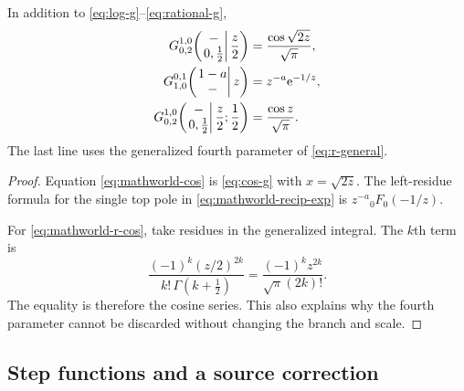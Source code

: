 \begin{theorem}\label{thm:mathworld-specials}
In addition to \eqref{eq:log-g}--\eqref{eq:rational-g},
\begin{align}
G_{0,2}^{1,0}\!\left(
 \left.\begin{matrix}-\\0,\frac12\end{matrix}\right|\frac z2\right)
 &=\frac{\cos\sqrt{2z}}{\sqrt\pi},
 \label{eq:mathworld-cos}\\
G_{1,0}^{0,1}\!\left(
 \left.\begin{matrix}1-a\\-\end{matrix}\right|z\right)
 &=z^{-a}\mathrm e^{-1/z},
 \label{eq:mathworld-recip-exp}\\
G_{0,2}^{1,0}\!\left(
 \left.\begin{matrix}-\\0,\frac12\end{matrix}\right|\frac z2;\frac12\right)
 &=\frac{\cos z}{\sqrt\pi}.
 \label{eq:mathworld-r-cos}
\end{align}
The last line uses the generalized fourth parameter of
\eqref{eq:r-general}.
\end{theorem}
\begin{proof}
Equation \eqref{eq:mathworld-cos} is \eqref{eq:cos-g} with
$x=\sqrt{2z}$.  The left-residue formula for the single top pole in
\eqref{eq:mathworld-recip-exp} is
$z^{-a}{}_0F_0(-1/z)$.

For \eqref{eq:mathworld-r-cos}, take residues in the generalized integral.
The $k$th term is
\[
 \frac{(-1)^k(z/2)^{2k}}{k!\,\Gamma(k+\frac12)}
 =\frac{(-1)^kz^{2k}}{\sqrt\pi(2k)!}.
\]
The equality is therefore the cosine series.  This also explains why the
fourth parameter cannot be discarded without changing the branch and scale.
\end{proof}

\subsection{Step functions and a source correction}

